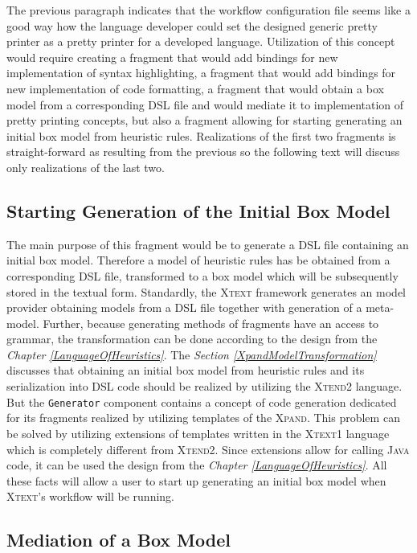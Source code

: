 \documentclass[12pt,notitlepage,a4paper]{report}
\begin{document}
The previous paragraph indicates that the workflow configuration file seems like a good way how the language developer could set the designed generic pretty printer as a pretty printer for a developed language. Utilization of this concept would require creating a fragment that would add bindings for new implementation of syntax highlighting, a fragment that would add bindings for new implementation of code formatting, a fragment that would obtain a box model from a corresponding DSL file and would mediate it to implementation of pretty printing concepts, but also a fragment allowing for starting generating an initial box model from heuristic rules. Realizations of the first two fragments is straight-forward as resulting from the previous so the following text will discuss only realizations of the last two.

\subsection {Starting Generation of the Initial Box Model}
\label{StartingGeneration}
The main purpose of this fragment would be to generate a DSL file containing an initial box model. Therefore a model of heuristic rules  has be obtained from a corresponding DSL file, transformed to a box model which will be subsequently stored in the textual form. Standardly, the \textsc{Xtext} framework generates an model provider obtaining  models from a DSL file together with generation of a meta-model. Further, because generating methods of fragments have an access to grammar, the transformation can be done according to the design from the \textit{Chapter \ref{LanguageOfHeuristics}}. The \textit{Section \ref{XpandModelTransformation}} discusses that obtaining an initial box model from heuristic rules and its serialization into DSL code should be realized by utilizing the \textsc{Xtend2} language. But the \texttt{Generator} component contains a concept of code generation dedicated for its fragments realized by utilizing templates of the \textsc{Xpand}. This problem can be solved by utilizing extensions of templates written in the \textsc{Xtext1} language \cite{Xtend1} which is completely different from \textsc{Xtend2}. Since extensions allow for calling \textsc{Java} code, it can be used the design from the \textit{Chapter \ref{LanguageOfHeuristics}}. All these facts will allow a user to start up generating an initial box model when \textsc{Xtext}'s workflow will be running.

\subsection {Mediation of a Box Model}
\end{document}
